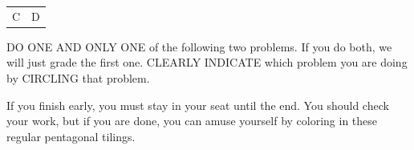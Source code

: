 \documentclass[addpoints,12pt]{exam}
\begin{document}
\begin{questions}
\begin{parts}
\begin{tabular}{c|c}
 C & D
 \end{tabular}
 
 
\end{parts}

\newpage


 
 \question[5] DO ONE AND ONLY ONE of the following two problems. If you do both, we will just grade the first one. CLEARLY INDICATE which problem you are doing by CIRCLING that problem.

\end{questions}

\newpage

If you finish early, you must stay in your seat until the end. You should check your work, but if you are done, you can amuse yourself by coloring in these regular pentagonal tilings.
\end{document}
